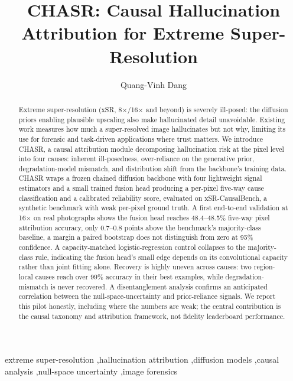\documentclass[review]{elsarticle}
\begin{document}
\begin{frontmatter}

\title{CHASR: Causal Hallucination Attribution for Extreme Super-Resolution}

\author{Quang-Vinh Dang}
\address{British University Vietnam, Hung Yen, Vietnam}

\begin{abstract}
Extreme super-resolution (xSR, 8$\times$/16$\times$ and beyond) is severely ill-posed: the diffusion priors enabling plausible upscaling also make hallucinated detail unavoidable. Existing work measures how much a super-resolved image hallucinates but not why, limiting its use for forensic and task-driven applications where trust matters. We introduce CHASR, a causal attribution module decomposing hallucination risk at the pixel level into four causes: inherent ill-posedness, over-reliance on the generative prior, degradation-model mismatch, and distribution shift from the backbone's training data. CHASR wraps a frozen chained diffusion backbone with four lightweight signal estimators and a small trained fusion head producing a per-pixel five-way cause classification and a calibrated reliability score, evaluated on xSR-CausalBench, a synthetic benchmark with weak per-pixel ground truth. A first end-to-end validation at 16$\times$ on real photographs shows the fusion head reaches 48.4--48.5\% five-way pixel attribution accuracy, only 0.7--0.8 points above the benchmark's majority-class baseline, a margin a paired bootstrap does not distinguish from zero at 95\% confidence. A capacity-matched logistic-regression control collapses to the majority-class rule, indicating the fusion head's small edge depends on its convolutional capacity rather than joint fitting alone. Recovery is highly uneven across causes: two region-local causes reach over 99\% accuracy in their best examples, while degradation-mismatch is never recovered. A disentanglement analysis confirms an anticipated correlation between the null-space-uncertainty and prior-reliance signals. We report this pilot honestly, including where the numbers are weak; the central contribution is the causal taxonomy and attribution framework, not fidelity leaderboard performance.
\end{abstract}

\begin{keyword}
extreme super-resolution \sep hallucination attribution \sep diffusion models \sep causal analysis \sep null-space uncertainty \sep image forensics
\end{keyword}

\end{frontmatter}
\end{document}

